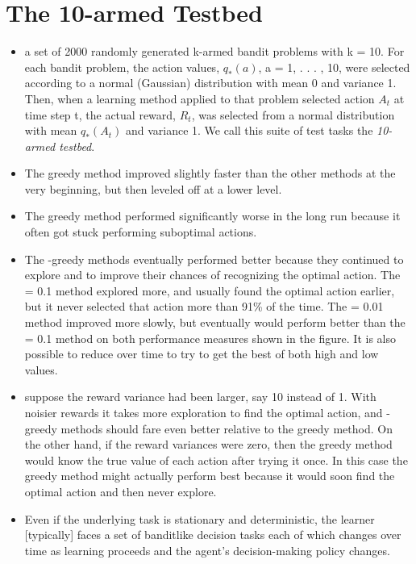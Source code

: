 \documentclass{article}
\begin{document}
\section{The 10-armed Testbed}
\begin{itemize}
    \item a set of 2000 randomly generated k-armed bandit problems with k = 10. For each bandit
    problem, the action values, $q_*(a)$, a = 1, . . . , 10,
    were selected according to a normal (Gaussian) distribution with mean 0 and variance 1.
    Then, when a learning method applied to that problem selected action $A_t$ at time step t,
    the actual reward, $R_t$, was selected from a normal distribution with mean $q_*(A_t)$ and
    variance 1. We call this suite of test tasks the \emph{10-armed testbed}.
    \item The greedy method improved slightly faster than the
    other methods at the very beginning, but then leveled off at a lower level.
    \item The greedy method performed significantly worse in the long run because it
    often got stuck performing suboptimal actions.
    \item The \textepsilon-greedy methods eventually performed better because they continued
    to explore and to improve their chances of recognizing the optimal action. The \textepsilon = 0.1
    method explored more, and usually found the optimal action earlier, but it never selected
    that action more than 91\% of the time. The \textepsilon = 0.01 method improved more slowly, but
    eventually would perform better than the \textepsilon = 0.1 method on both performance measures
    shown in the figure. It is also possible to reduce \textepsilon \thickspace over time to try to get the best of both
    high and low values.
    \item suppose the reward variance had been larger, say 10 instead of 1. With noisier rewards
    it takes more exploration to find the optimal action, and \textepsilon-greedy methods should fare
    even better relative to the greedy method. On the other hand, if the reward variances
    were zero, then the greedy method would know the true value of each action after trying
    it once. In this case the greedy method might actually perform best because it would
    soon find the optimal action and then never explore.
    \item Even if the underlying task is stationary and deterministic, the learner [typically] faces a set of banditlike decision 
    tasks each of which changes over time as learning proceeds and the agent's decision-making policy changes.
\end{itemize}
\end{document}
